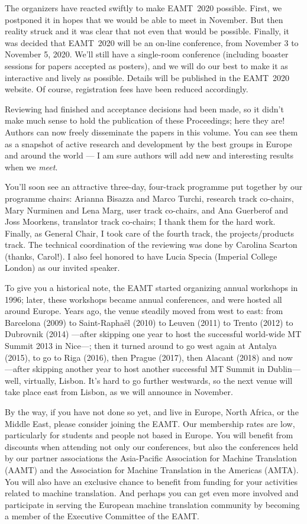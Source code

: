 \documentclass[a4paper,11pt,twoside]{book}
\begin{document}
The organizers have reacted swiftly to make EAMT~2020 possible. First, we postponed it in hopes that we would be able to meet in November. But then reality struck and it was clear that not even that would be possible. Finally, it was decided that EAMT~2020 will be an on-line conference, from November 3 to November 5, 2020. We'll still have a single-room conference  (including boaster sessions for papers accepted as posters), and we will do our best to make it as interactive and lively as possible. Details will be published in the EAMT~2020 website. Of course, registration fees have been reduced accordingly.

Reviewing had finished and acceptance decisions had been made, so it didn't make much sense to hold the publication of these Proceedings; here they are! Authors can now freely disseminate the papers in this volume. You can see them as a snapshot of active research and development by the best groups in Europe and around the world --- I am sure authors will add new and interesting results when we \emph{meet}.

You'll soon see an attractive three-day, four-track programme put together by our programme chairs: Arianna Bisazza and Marco Turchi, research track co-chairs, Mary Nurminen and Lena Marg, user track co-chairs, and Ana Guerberof and Joss Moorkens, translator track co-chairs; I thank them for the hard work. Finally, as General Chair, I took care of the fourth track, the projects/products track. The technical coordination of the reviewing was done by Carolina Scarton (thanks, Carol!).  I also feel honored to have Lucia Specia (Imperial College London) as our invited speaker.

To give you a historical note, the EAMT started organizing annual workshops in 1996; later, these workshops became annual conferences, and were hosted all around Europe. Years ago, the venue steadily moved from west to east: from Barcelona (2009) to Saint-Rapha\"{e}l (2010) to Leuven (2011) to Trento (2012) to Dubrovnik (2014) ---after skipping one year to host the successful world-wide MT Summit 2013 in Nice---; then it turned  around to go west again at Antalya (2015),
to go to Riga (2016), then Prague (2017), then Alacant (2018) and now ---after skipping another year to host another successful MT Summit in Dublin--- well, virtually, Lisbon. It's hard to go further westwards, so the next venue will take place east from Lisbon, as we will announce in November.

By the way, if you have not done so yet, and live in Europe, North Africa, or the Middle East,
please consider joining the EAMT. Our membership rates are low, particularly for students
and people not based in Europe. You will benefit from discounts when attending not only
our conferences, but also the conferences held by our partner associations the Asia-Pacific
Association for Machine Translation (AAMT) and the Association for Machine Translation in
the Americas (AMTA). You will also have an exclusive chance to benefit from funding for your
activities related to machine translation. And perhaps you can get even more involved and
participate in serving the European machine translation community by becoming a member of
the Executive Committee of the EAMT.
\end{document}
